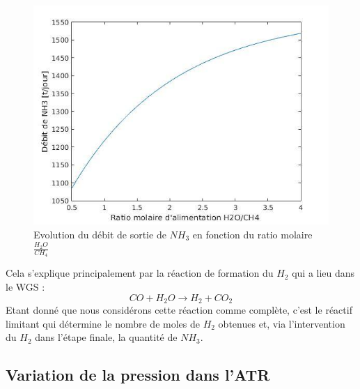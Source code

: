 \documentclass[12pt]{report}
\begin{document}
\begin{figure}[H]
\begin{center}
\includegraphics[scale=0.6]{debit_NH3_ratio_H2O}
\caption{Evolution du débit de sortie de $NH_3$ en fonction du ratio molaire $\frac{H_2O}{CH_4}$}
\end{center}
\end{figure}

Cela s'explique principalement par la réaction de formation du $H_2$ qui a lieu dans le WGS : 
\begin{equation}
CO + H_2O \rightarrow H_2 + CO_2
\end{equation}
Etant donné que nous considérons cette réaction comme complète,  c'est le réactif limitant qui détermine le nombre de moles de $H_2$ obtenues et, via l'intervention du $H_2$ dans l'étape finale, la quantité de $NH_3$.\\


\subsection{Variation de la pression dans l'ATR}
\end{document}
